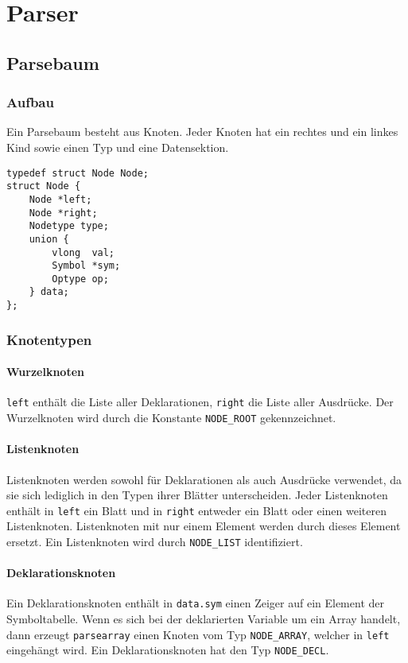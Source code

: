 \chapter{Parser}
\label{chap:parser}

\section{Parsebaum}
\label{sec:parsetree}

\subsection{Aufbau}
Ein Parsebaum besteht aus Knoten.
Jeder Knoten hat ein rechtes und ein linkes Kind sowie einen Typ und eine Datensektion.

\begin{lstlisting}
typedef struct Node Node;
struct Node {
	Node *left;
	Node *right;
	Nodetype type;
	union {
		vlong  val;
		Symbol *sym;
		Optype op;
	} data;
};
\end{lstlisting}

\subsection{Knotentypen}

\subsubsection{Wurzelknoten}
\texttt{left} enthält die Liste aller Deklarationen,
\texttt{right} die Liste aller Ausdrücke.
Der Wurzelknoten wird durch die Konstante \texttt{NODE_ROOT} gekennzeichnet.

\subsubsection{Listenknoten}
Listenknoten werden sowohl für Deklarationen als auch Ausdrücke verwendet,
da sie sich lediglich in den Typen ihrer Blätter unterscheiden.
Jeder Listenknoten enthält in \texttt{left} ein Blatt
und in \texttt{right} entweder ein Blatt oder einen weiteren Listenknoten.
Listenknoten mit nur einem Element werden durch dieses Element ersetzt.
Ein Listenknoten wird durch \texttt{NODE_LIST} identifiziert.

\subsubsection{Deklarationsknoten}
Ein Deklarationsknoten enthält in \texttt{data.sym} einen Zeiger auf ein Element der Symboltabelle.
Wenn es sich bei der deklarierten Variable um ein Array handelt,
dann erzeugt \texttt{parsearray} einen Knoten vom Typ \texttt{NODE_ARRAY},
welcher in \texttt{left} eingehängt wird.
Ein Deklarationsknoten hat den Typ \texttt{NODE_DECL}.

